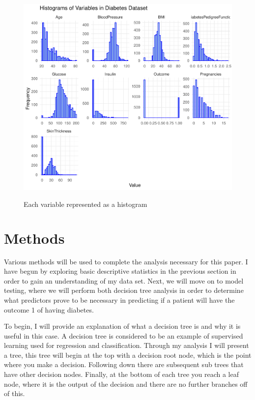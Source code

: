 \documentclass[12pt]{article}
\begin{document}
  \begin{figure}[tbp]
    \centering
    \caption{Each variable represented as a histogram}
      \includegraphics[width=\textwidth]{Histograms.pdf}
      \label{fig:histogram}
      \end{figure}

\section{Methods}
\label{sec:meth}
    Various methods will be used to complete the analysis necessary for this paper. I have begun by exploring basic descriptive statistics in
    the previous section in order to gain an understanding of my data set. Next, we will move on to model testing, where we will perform both 
    decision tree analysis in order to determine what predictors prove to be necessary in predicting if a patient
    will have the outcome 1 of having diabetes. 

    To begin, I will provide an explanation of what a decision tree is and why it is useful in this case. A decision tree is considered
    to be an example of supervised learning used for regression and classification. Through my analysis I will present a tree, this tree
    will begin at the top with a decision root node, which is the point where you make a decision. Following down there are subsequent sub trees
    that have other decision nodes. Finally, at the bottom of each tree you reach a leaf node, where it is the output of the decision and 
    there are no further branches off of this.  
    
\end{document}
